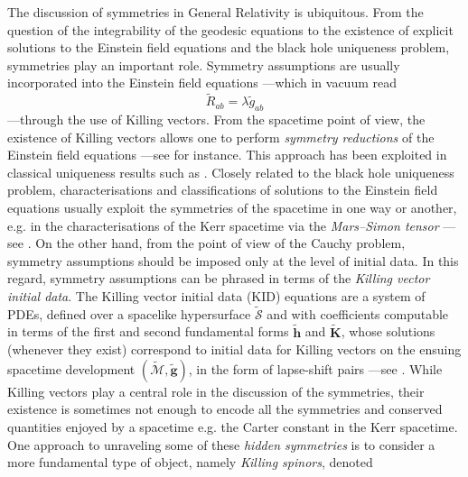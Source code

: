 \documentclass[10pt,a4paper]{article}
\theoremstyle{plain}
\def\bmg{{\bm g}}
\def\bmh{{\bm h}}
\def\bmK{{\bm K}}
\begin{document}
   
The discussion of symmetries  in General
Relativity is ubiquitous. From the question of the integrability of the geodesic
equations to the existence of explicit solutions to the Einstein field
equations and the black hole uniqueness problem, symmetries play an important role.   
Symmetry assumptions are usually incorporated into
 the Einstein field equations ---which in vacuum read
\begin{equation}
\tilde{R}_{ab}=\lambda \tilde{g}_{ab}
\label{EFEVacuum}
\end{equation} 
---through the use of Killing vectors.  From the spacetime point of
view, the existence of Killing vectors allows one to perform
\emph{symmetry reductions} of the Einstein field equations ---see \cite{Wei90a} for
instance. This approach has been exploited in classical
uniqueness results such as \cite{Rob75b}.  Closely related to the
black hole uniqueness problem, characterisations and classifications
of solutions to the Einstein field equations usually exploit the
symmetries of the spacetime in one way or another, e.g. in the
characterisations of the Kerr spacetime via the \emph{Mars--Simon
  tensor} ---see \cite{Mar99,Mar00,Sim84, MarPaeSenSim16, MarPeo22}.
On the other hand, from the point of view of the Cauchy problem,
symmetry assumptions should be imposed only at the level of initial
data. In this regard, symmetry assumptions can be phrased in terms of
the \emph{Killing vector
initial data}.  The Killing vector initial data (KID) equations are a
system of PDEs, defined over a spacelike hypersurface $\tilde{\mathcal{S}}$ and with coefficients computable in terms of the first and second fundamental forms $\tilde{\bmh}$ and $\tilde{\bmK}$,
whose solutions (whenever they exist) correspond to initial data for Killing vectors on the ensuing spacetime development $(\tilde{\mathcal{M}},\tilde{\bmg})$, in the form of lapse-shift pairs ---see \cite{BeiChr97b}.
While Killing vectors
play a central role in the discussion of the symmetries, their existence is sometimes not enough to encode all the symmetries and conserved quantities enjoyed by a spacetime e.g. the Carter constant in the Kerr spacetime. One approach to unraveling some of
these \emph{hidden symmetries} is to consider a more fundamental type of object, namely \emph{Killing spinors}, denoted
\end{document}

